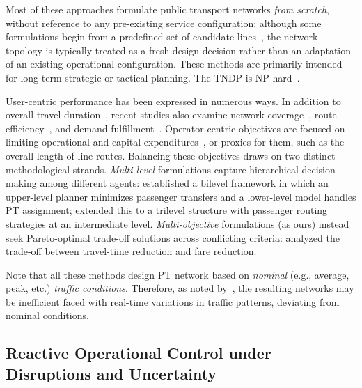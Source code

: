 \documentclass[a4paper,fleqn]{cas-sc}
\begin{document}
Most of these approaches formulate public transport networks \emph{from scratch}, without reference to any pre-existing service configuration; although some formulations begin from a predefined set of candidate lines~\citep{cervantes2023analyzing}, the network topology is typically treated as a fresh design decision rather than an adaptation of an existing operational configuration. These methods are primarily intended for long-term strategic or tactical planning.
The TNDP is NP-hard~\citep{magnanti1984network}.

User-centric performance has been expressed in numerous ways. In addition to overall travel duration~\citep{john2014improved,heyken2019adaptive}, recent studies also examine network coverage~\citep{cadarso2017rapid}, route efficiency~\citep{suman2019improvement}, and demand fulfillment~\citep{barahimi2021multi}. Operator-centric objectives are focused on limiting operational and capital expenditures~\citep{ahern2022approximate,chen2018continuum,calabro2023adaptive}, or proxies for them, such as the overall length of line routes.
%
Balancing these objectives draws on two distinct methodological strands. \emph{Multi-level} formulations capture hierarchical decision-making among different agents: \cite{szeto2014transit} established a bilevel framework in which an upper-level planner minimizes passenger transfers and a lower-level model handles PT assignment; \cite{tian2021service} extended this to a trilevel structure with passenger routing strategies at an intermediate level. \emph{Multi-objective} formulations (as ours) instead seek Pareto-optimal trade-off solutions across conflicting criteria: \cite{cervantes2023analyzing} analyzed the trade-off between travel-time reduction and fare reduction. 

Note that all these methods design PT network based on \emph{nominal} (e.g., average, peak, etc.) \emph{traffic conditions}.
Therefore, as noted by~\citep{tan2024optimizing}, the resulting networks may be inefficient faced with real-time variations in traffic patterns, deviating from nominal conditions. 

\subsection{Reactive Operational Control under Disruptions and Uncertainty}
\label{sec:reactive}
\end{document}
